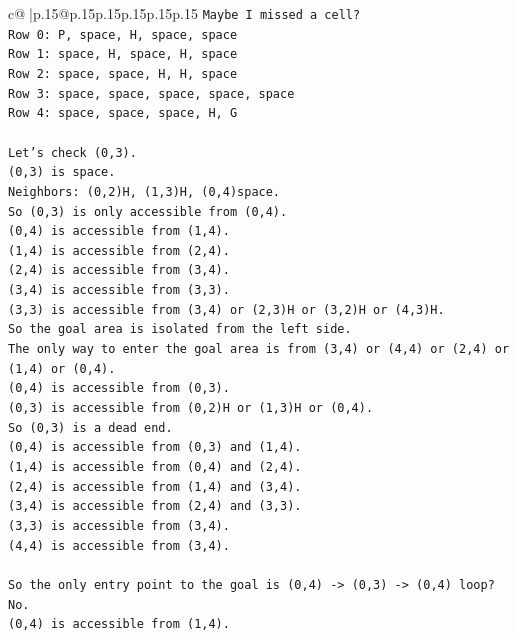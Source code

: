 \documentclass{article}
\begin{document}
{\begin{supertabular}{c@{$\;$}|p{.15\linewidth}@{}p{.15\linewidth}p{.15\linewidth}p{.15\linewidth}p{.15\linewidth}p{.15\linewidth}}
{{{\texttt{Maybe I missed a cell?} \\
\texttt{Row 0: P, space, H, space, space} \\
\texttt{Row 1: space, H, space, H, space} \\
\texttt{Row 2: space, space, H, H, space} \\
\texttt{Row 3: space, space, space, space, space} \\
\texttt{Row 4: space, space, space, H, G} \\
\\ 
\texttt{Let's check (0,3).} \\
\texttt{(0,3) is space.} \\
\texttt{Neighbors: (0,2)H, (1,3)H, (0,4)space.} \\
\texttt{So (0,3) is only accessible from (0,4).} \\
\texttt{(0,4) is accessible from (1,4).} \\
\texttt{(1,4) is accessible from (2,4).} \\
\texttt{(2,4) is accessible from (3,4).} \\
\texttt{(3,4) is accessible from (3,3).} \\
\texttt{(3,3) is accessible from (3,4) or (2,3)H or (3,2)H or (4,3)H.} \\
\texttt{So the goal area is isolated from the left side.} \\
\texttt{The only way to enter the goal area is from (3,4) or (4,4) or (2,4) or (1,4) or (0,4).} \\
\texttt{(0,4) is accessible from (0,3).} \\
\texttt{(0,3) is accessible from (0,2)H or (1,3)H or (0,4).} \\
\texttt{So (0,3) is a dead end.} \\
\texttt{(0,4) is accessible from (0,3) and (1,4).} \\
\texttt{(1,4) is accessible from (0,4) and (2,4).} \\
\texttt{(2,4) is accessible from (1,4) and (3,4).} \\
\texttt{(3,4) is accessible from (2,4) and (3,3).} \\
\texttt{(3,3) is accessible from (3,4).} \\
\texttt{(4,4) is accessible from (3,4).} \\
\\ 
\texttt{So the only entry point to the goal is (0,4) {-}> (0,3) {-}> (0,4) loop? No.} \\
\texttt{(0,4) is accessible from (1,4).} \\
}}}
\end{supertabular}}
\end{document}
